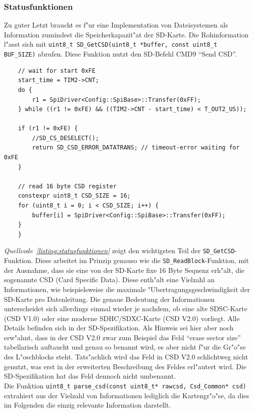 \documentclass[11pt]{article}
\newcommand*{\coderef}[1]{\textit{Quellcode~\ref{#1}}}
\newcommand{\cpp}[1]{\texttt{#1}}
\begin{document}
\subsubsection{Statusfunktionen}
Zu guter Letzt braucht es f"ur eine Implementation von Dateisystemen als Information zumindest
die Speicherkapazit"at der SD-Karte. Die Rohinformation l"asst sich mit   
\cpp{uint8_t SD_GetCSD(uint8_t *buffer, const uint8_t BUF_SIZE)}
abrufen. Diese Funktion nutzt den SD-Befehl CMD9 \enquote{Send CSD}.


\begin{listing}[H]
    \begin{verbatim}
    // wait for start 0xFE
    start_time = TIM2->CNT;
    do {
        r1 = SpiDriver<Config::SpiBase>::Transfer(0xFF);
    } while ((r1 != 0xFE) && ((TIM2->CNT - start_time) < T_OUT2_US));

    if (r1 != 0xFE) {
        //SD_CS_DESELECT();
        return SD_CSD_ERROR_DATATRANS; // timeout-error waiting for 0xFE
    }

    // read 16 byte CSD register
    constexpr uint8_t CSD_SIZE = 16;
    for (uint8_t i = 0; i < CSD_SIZE; i++) {
        buffer[i] = SpiDriver<Config::SpiBase>::Transfer(0xFF);
    }
    }
    \end{verbatim}
\caption{Auszug aus der Funktion \cpp{SD_GetCSD}}
\label{listing:statusfunktionen}
\end{listing}
\coderef{listing:statusfunktionen} zeigt den wichtigsten Teil der \cpp{SD_GetCSD}-Funktion.
Diese arbeitet im Prinzip genauso wie die \cpp{SD_ReadBlock}-Funktion, mit der Ausnahme, 
dass sie eine von der SD-Karte fixe 16 Byte Sequenz erh"alt, die sogenannte CSD (Card Specific Data).
Diese enth"alt eine Vielzahl an Informationen, wie beispielsweise die maximale
"Ubertragungsgeschwindigkeit der SD-Karte pro Datenleitung. Die genaue Bedeutung der Informationen
unterscheidet sich allerdings einmal wieder je nachdem, ob eine alte SDSC-Karte (CSD V1.0) oder
eine moderne SDHC/SDXC-Karte (CSD V2.0) vorliegt. Alle Details befinden sich in der SD-Spezifikation.
Als Hinweis sei hier aber noch erw"ahnt, dass in der CSD V2.0 zwar zum Beispiel das Feld
\enquote{erase sector size} tabellarisch auftaucht und genau so benannt wird, es aber nicht f"ur die Gr"o"se
des L"oschblocks steht. Tats"achlich wird das Feld in CSD V2.0 schlichtweg nicht genutzt, was erst in 
der erweiterten Beschreibung des Feldes erl"autert wird. 
Die SD-Spezifikation hat das Feld dennoch nicht umbenannt. \\
Die Funktion
\cpp{uint8_t parse_csd(const uint8_t* rawcsd, Csd_Common* csd)}
extrahiert aus der Vielzahl von Informationen lediglich die Kartengr"o"se,
da dies im Folgenden die einzig relevante Information darstellt. 
\end{document}
